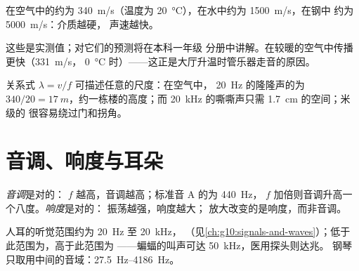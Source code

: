 \begin{proposition}[声速]\label{prop:g12:sound-acoustics:speed}
%
在空气中的约为 \qty{340}{m/s}（温度为
\qty{20}{\degreeCelsius}），在水中约为 \qty{1500}{m/s}，在钢中
约为 \qty{5000}{m/s}：介质越硬，
声速越快。\admitted
\end{proposition}

\begin{remark}[暖空气中声速更快]\label{rem:g12:sound-acoustics:temperature}
这些是实测值；对它们的预测将在本科一年级
分册中讲解。在较暖的空气中传播更快（\qty{331}{m/s}，
\qty{0}{\degreeCelsius} 时）——这正是大厅升温时管乐器走音的原因。
\end{remark}

\begin{example}[声波的尺度]\label{ex:g12:sound-acoustics:wavelengths}
关系式 $\lambda = v/f$ 可描述任意的尺度：在空气中，
\qty{20}{Hz} 的隆隆声的为 $340/20 = \qty{17}{m}$，约一栋楼的高度；而
\qty{20}{kHz} 的嘶嘶声只需 \qty{1.7}{cm} 的空间；米级的
很容易绕过门和拐角。
\end{example}

\section{音调、响度与耳朵}

\begin{definition}[音调与响度]\label{def:g12:sound-acoustics:pitch-loudness}
\emph{音调}是对的：
 $f$ 越高，音调越高；标准音 A 的为 \qty{440}{Hz}，
 $f$ 加倍则音调升高一个八度。\emph{响度}是对的：
振荡越强，响度越大；
放大改变的是响度，而非音调。
\end{definition}

\begin{remark}[人耳的听觉范围]\label{rem:g12:sound-acoustics:audible}
人耳的听觉范围约为 \qty{20}{Hz} 至 \qty{20}{kHz}，
（见\cref{ch:g10:signals-and-waves}）；低于此范围为，高于此范围为
——蝙蝠的叫声可达 \qty{50}{kHz}，医用探头则达兆。
钢琴只取用中间的音域：\qtyrange{27.5}{4186}{Hz}。
\end{remark}

